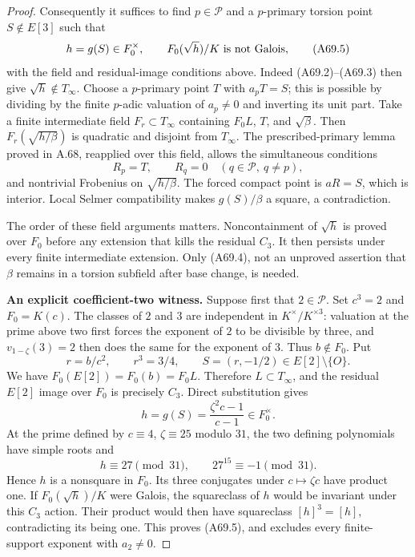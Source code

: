 \begin{proof}
Consequently it suffices to find $p\in\mathcal P$
and a $p$-primary torsion point $S\notin E[3]$
such that
\[
 h=g(S)\in F_0^\times,
 \qquad F_0(\sqrt h)/K\ \hbox{is not Galois},
 \tag{A69.5}
\]
with the field and residual-image conditions above.
Indeed (A69.2)--(A69.3) then give
$\sqrt h\notin T_\infty$. Choose a $p$-primary
point $T$ with $a_pT=S$; this is possible by
dividing by the finite $p$-adic valuation of
$a_p\ne0$ and inverting its unit part. Take a
finite intermediate field $F_r\subset T_\infty$
containing $F_0L$, $T$, and $\sqrt\beta$.
Then $F_r(\sqrt{h/\beta})$ is quadratic and
disjoint from $T_\infty$. The prescribed-primary
lemma proved in A.68, reapplied over this field,
allows the simultaneous conditions
\[
 R_p=T,\qquad R_q=0\quad(q\in\mathcal P,\ q\ne p),
 \tag{A69.6}
\]
and nontrivial Frobenius on $\sqrt{h/\beta}$.
The forced compact point is $aR=S$, which is
interior. Local Selmer compatibility makes
$g(S)/\beta$ a square, a contradiction.

The order of these field arguments matters.
Noncontainment of $\sqrt h$ is proved over $F_0$
before any extension that kills the residual
$C_3$. It then persists under every finite
intermediate extension. Only (A69.4), not an
unproved assertion that $\beta$ remains in a
torsion subfield after base change, is needed.

\par\smallskip\noindent\textbf{An explicit coefficient-two witness.}\enspace
Suppose first that $2\in\mathcal P$. Set
$c^3=2$ and $F_0=K(c)$. The classes of $2$ and
$3$ are independent in $K^\times/K^{\times3}$:
valuation at the prime above two first forces
the exponent of $2$ to be divisible by three,
and $v_{1-\zeta}(3)=2$ then does the same for
the exponent of $3$. Thus $b\notin F_0$.
Put
\[
 r=b/c^2,\qquad r^3=3/4,
 \qquad S=(r,-1/2)\in E[2]\setminus\{O\}.
\]
We have $F_0(E[2])=F_0(b)=F_0L$. Therefore
$L\subset T_\infty$, and the residual
$E[2]$ image over $F_0$ is precisely $C_3$.
Direct substitution gives
\[
 h=g(S)=\frac{\zeta^2c-1}{c-1}\in F_0^\times.
 \tag{A69.7}
\]
At the prime defined by $c\equiv4$, $\zeta\equiv25$
modulo $31$, the two defining polynomials have
simple roots and
\[
 h\equiv27\pmod{31},\qquad 27^{15}\equiv-1\pmod{31}.
\]
Hence $h$ is a nonsquare in $F_0$.
Its three conjugates under $c\mapsto\zeta c$
have product one. If $F_0(\sqrt h)/K$ were
Galois, the squareclass of $h$ would be
invariant under this $C_3$ action. Their
product would then have squareclass
$[h]^3=[h]$, contradicting its being one.
This proves (A69.5), and excludes every
finite-support exponent with $a_2\ne0$.


\end{proof}
